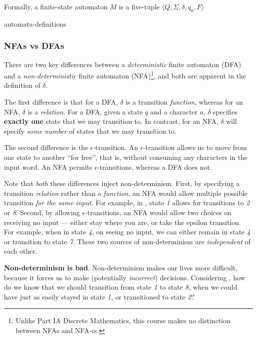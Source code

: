 Formally, a finite-state automaton $M$ is a five-tuple $\langle Q, \Sigma, \delta, q_0, F \rangle$

\begin{center}
{automata-definitions}
\end{center}

\subsubsection{NFAs vs DFAs}
There are two key differences between a \textit{deterministic} finite automaton (DFA) and a \textit{non-deterministic} finite automaton (NFA)\footnote{Unlike {\sffamily Part IA Discrete Mathematics}, this course makes no distinction between NFAs and NFA-$\epsilon$s.}, and both are apparent in the definition of $\delta$. 

The first difference is that for a DFA, $\delta$ is a transition \emph{function}, whereas for an NFA, $\delta$ is a \emph{relation}. For a DFA, given a state $q$ and a character $a$, $\delta$ specifies \textbf{exactly one} state that we may transition to. In contrast, for an NFA, $\delta$ will specify \emph{some number} of states that we may transition to.

The second difference is the $\epsilon$-transition. An $\epsilon$-transition allows us to move from one state to another ``for free'', that is, without consuming any characters in the input word. An NFA permits $\epsilon$-transitions, whereas a DFA does not. 

Note that \emph{both} these differences inject non-determinism. First, by specifying a transition \emph{relation} rather than a \emph{function}, an NFA would allow multiple possible transition \emph{for the same input}. For example, in , state \textit{1} allows for transitions to \textit{2} or \textit{8}. Second, by allowing $\epsilon$-transitions, an NFA would allow two choices on receiving no input --- either stay where you are, or take the epsilon transition. For example, when in state \textit{4}, on seeing no input, we can either remain in state \textit{4} or transition to state \textit{7}. These two sources of non-determinism are \textit{independent} of each other.

\textbf{Non-determinism is bad}. Non-determinism makes our lives more difficult, because it forces us to make (potentially \emph{incorrect}) decisions. Considering , how do we know that we should transition from state \textit{1} to state \textit{8}, when we could have just as easily stayed in state \textit{1}, or transitioned to state \textit{2}?

